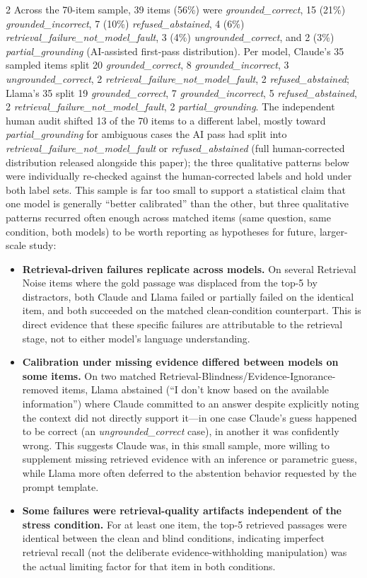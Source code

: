\documentclass[11pt,a4paper]{article}
\begin{document}
\begin{multicols}{2}
Across the 70-item sample, 39 items (56\%) were \textit{grounded\_correct}, 15 (21\%) \textit{grounded\_incorrect}, 7 (10\%) \textit{refused\_abstained}, 4 (6\%) \textit{retrieval\_failure\_not\_model\_fault}, 3 (4\%) \textit{ungrounded\_correct}, and 2 (3\%) \textit{partial\_grounding} (AI-assisted first-pass distribution). Per model, Claude's 35 sampled items split 20 \textit{grounded\_correct}, 8 \textit{grounded\_incorrect}, 3 \textit{ungrounded\_correct}, 2 \textit{retrieval\_failure\_not\_model\_fault}, 2 \textit{refused\_abstained}; Llama's 35 split 19 \textit{grounded\_correct}, 7 \textit{grounded\_incorrect}, 5 \textit{refused\_abstained}, 2 \textit{retrieval\_failure\_not\_model\_fault}, 2 \textit{partial\_grounding}. The independent human audit shifted 13 of the 70 items to a different label, mostly toward \textit{partial\_grounding} for ambiguous cases the AI pass had split into \textit{retrieval\_failure\_not\_model\_fault} or \textit{refused\_abstained} (full human-corrected distribution released alongside this paper); the three qualitative patterns below were individually re-checked against the human-corrected labels and hold under both label sets. This sample is far too small to support a statistical claim that one model is generally ``better calibrated'' than the other, but three qualitative patterns recurred often enough across matched items (same question, same condition, both models) to be worth reporting as hypotheses for future, larger-scale study:

\begin{itemize}[leftmargin=*,nosep]
\item \textbf{Retrieval-driven failures replicate across models.} On several Retrieval Noise items where the gold passage was displaced from the top-5 by distractors, both Claude and Llama failed or partially failed on the identical item, and both succeeded on the matched clean-condition counterpart. This is direct evidence that these specific failures are attributable to the retrieval stage, not to either model's language understanding.
\item \textbf{Calibration under missing evidence differed between models on some items.} On two matched Retrieval-Blindness/Evidence-Ignorance-removed items, Llama abstained (``I don't know based on the available information'') where Claude committed to an answer despite explicitly noting the context did not directly support it---in one case Claude's guess happened to be correct (an \textit{ungrounded\_correct} case), in another it was confidently wrong. This suggests Claude was, in this small sample, more willing to supplement missing retrieved evidence with an inference or parametric guess, while Llama more often deferred to the abstention behavior requested by the prompt template.
\item \textbf{Some failures were retrieval-quality artifacts independent of the stress condition.} For at least one item, the top-5 retrieved passages were identical between the clean and blind conditions, indicating imperfect retrieval recall (not the deliberate evidence-withholding manipulation) was the actual limiting factor for that item in both conditions.
\end{itemize}


\end{multicols}
\end{document}
